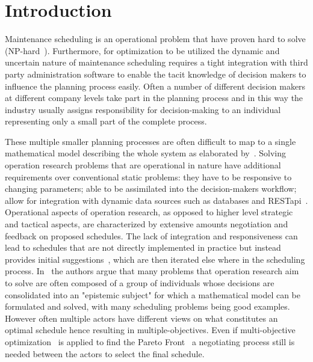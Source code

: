 \documentclass[preprint,12pt,authoryear]{elsarticle}
\begin{document}
\section{Introduction}
\label{sec:1-introduction}

Maintenance scheduling is an operational problem that have proven hard to solve (NP-hard~\citep{garey1979computers}). Furthermore, for optimization to be utilized the dynamic and uncertain nature of maintenance scheduling requires a tight integration with third party administration software to enable the tacit knowledge of decision makers to influence the planning process easily. Often a number of different decision makers at different company levels take part in the planning process and in this way the industry usually assigns responsibility for decision-making  to an individual representing only a small part of the complete process. 

These multiple smaller planning processes are often difficult to map to a single mathematical model describing the whole system as elaborated by~\citep{barthelemy2002human}. Solving operation research problems that are operational in nature have additional requirements over conventional static problems: they have to be responsive to changing parameters; able to be assimilated into the decision-makers workflow; allow for integration with dynamic data sources such as databases and RESTapi~\citep{meignan_review_2015}. Operational aspects of operation research, as opposed to higher level strategic and tactical aspects, are characterized by extensive amounts negotiation and feedback on proposed schedules. The lack of integration and responsiveness can lead to schedules that are not directly implemented in practice but instead provides initial suggestions~\citep{meignan_review_2015}, which are then iterated else where in the scheduling process. In~\citep{barthelemy2002human} the authors argue that many problems that operation research aim to solve are often composed of a group of individuals whose decisions are consolidated into an "epistemic subject" for which a mathematical model can be formulated and solved, with many scheduling problems being good examples. However often multiple actors have different views on what constitutes an optimal schedule hence resulting in multiple-objectives. Even if multi-objective optimization~\citep{ehrgott2002multiple} is applied to find the Pareto Front~\citep{Pareto1897} a negotiating process still is needed between the actors to select the final schedule.
\end{document}
